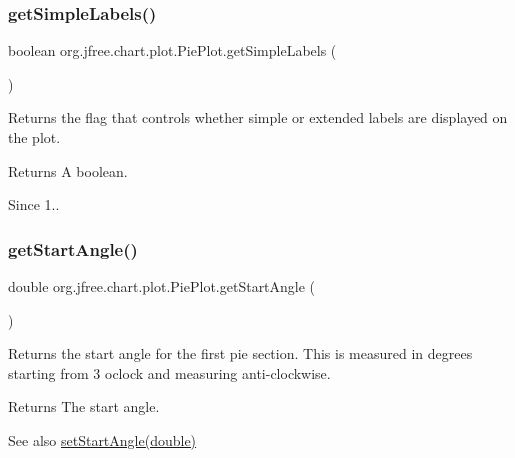 \subsubsection{\texorpdfstring{get\+Simple\+Labels()}{getSimpleLabels()}}
{\footnotesize\ttfamily boolean org.\+jfree.\+chart.\+plot.\+Pie\+Plot.\+get\+Simple\+Labels (\begin{DoxyParamCaption}{ }\end{DoxyParamCaption})}

Returns the flag that controls whether simple or extended labels are displayed on the plot.

\begin{DoxyReturn}{Returns}
A boolean.
\end{DoxyReturn}
\begin{DoxySince}{Since}
1.. 
\end{DoxySince}
\mbox{\label{classorg_1_1jfree_1_1chart_1_1plot_1_1_pie_plot_a71e04a3186bbc4c22788ae6a04853734}} 
\subsubsection{\texorpdfstring{get\+Start\+Angle()}{getStartAngle()}}
{\footnotesize\ttfamily double org.\+jfree.\+chart.\+plot.\+Pie\+Plot.\+get\+Start\+Angle (\begin{DoxyParamCaption}{ }\end{DoxyParamCaption})}

Returns the start angle for the first pie section. This is measured in degrees starting from 3 o\textquotesingle{}clock and measuring anti-\/clockwise.

\begin{DoxyReturn}{Returns}
The start angle.
\end{DoxyReturn}
\begin{DoxySeeAlso}{See also}
\mbox{\hyperlink{classorg_1_1jfree_1_1chart_1_1plot_1_1_pie_plot_a66d094282ec15d23beac9147c45eb213}{set\+Start\+Angle(double)}} 
\end{DoxySeeAlso}
\mbox{\label{classorg_1_1jfree_1_1chart_1_1plot_1_1_pie_plot_a75d9625162da953ddd01905de9805a25}} 

